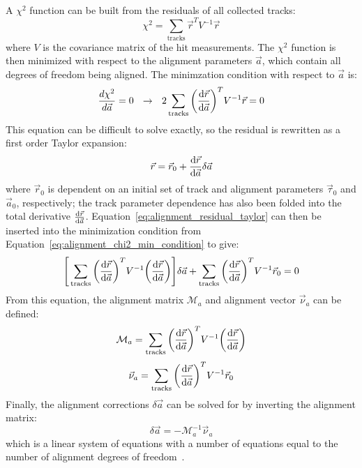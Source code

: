 A $\chi^2$ function can be built from the residuals of all collected tracks:
\begin{equation}
  \chi^2 = \sum\limits_{\textrm{tracks}}\vec{r}^{T}V^{-1}\vec{r}
  \label{eq:alignment_chi2}
\end{equation}
where $V$ is the covariance matrix of the hit measurements.
The $\chi^2$ function is then minimized with respect to the alignment parameters $\vec{a}$, which contain all degrees of freedom being aligned.
The minimzation condition with respect to $\vec{a}$ is:
\begin{equation}
  \frac{d\chi^2}{d\vec{a}} = 0 ~~ \rightarrow ~~ 2\sum\limits_{\textrm{tracks}}\bigg(\deriv{\vec{r}}{\vec{a}}\bigg)^{T}V^{-1}\vec{r} = 0
  \label{eq:alignment_chi2_min_condition}
\end{equation}
This equation can be difficult to solve exactly, so the residual is rewritten as a first order Taylor expansion:
\begin{equation}
  \vec{r} = \vec{r}_0+\deriv{\vec{r}}{\vec{a}}\delta\vec{a}
  \label{eq:alignment_residual_taylor}
\end{equation}
where $\vec{r}_0$ is dependent on an initial set of track and alignment parameters $\vec{\tau}_0$ and $\vec{a}_0$, respectively; the track parameter dependence has also been folded into the total derivative $\frac{\textrm{d}\vec{r}}{\textrm{d}\vec{a}}$.
Equation~\ref{eq:alignment_residual_taylor} can then be inserted into the minimization condition from Equation~\ref{eq:alignment_chi2_min_condition} to give:
\begin{equation}
  \Bigg[ \sum\limits_{\textrm{tracks}}\bigg(\deriv{\vec{r}}{\vec{a}}\bigg)^{T}V^{-1}\bigg(\deriv{\vec{r}}{\vec{a}}\bigg) \Bigg]\delta\vec{a} + \sum\limits_{\textrm{tracks}}\bigg(\deriv{\vec{r}}{\vec{a}}\bigg)^{T}V^{-1}\vec{r}_0 = 0
  \label{eq:alignment_chi2_min_taylor}
\end{equation}
From this equation, the alignment matrix $\mathcal{M}_a$ and alignment vector $\vec{\nu}_a$ can be defined:
\begin{equation}
  \mathcal{M}_a = \sum\limits_{\textrm{tracks}}\bigg(\deriv{\vec{r}}{\vec{a}}\bigg)^{T}V^{-1}\bigg(\deriv{\vec{r}}{\vec{a}}\bigg)
  \label{eq:alignment_matrix}
\end{equation}
\begin{equation}
  \vec{\nu}_a = \sum\limits_{\textrm{tracks}}\bigg(\deriv{\vec{r}}{\vec{a}}\bigg)^{T}V^{-1}\vec{r}_0
  \label{eq:alignment_vector}
\end{equation}
Finally, the alignment corrections $\delta\vec{a}$ can be solved for by inverting the alignment matrix:
\begin{equation}
  \delta\vec{a} = -\mathcal{M}_a^{-1}\vec{\nu}_a
  \label{eq:alignment_corrections}
\end{equation}
which is a linear system of equations with a number of equations equal to the number of alignment degrees of freedom~\cite{2011.alignment-7tev}.


